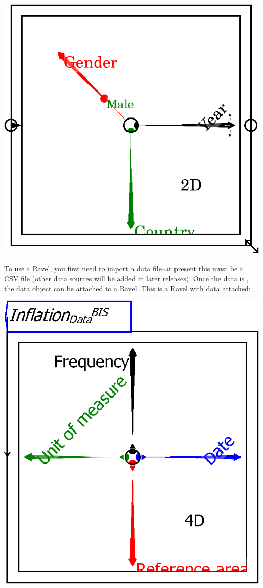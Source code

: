 \begin{center}
  \includegraphics{images/RavelBlank}
\end{center}

To use a Ravel, you first need to import a data file--at present
this must be a CSV file (other data sources will be added in later
releases). Once the data is , the data object
can be attached to a Ravel. This is a Ravel with data attached:

\begin{center}
\includegraphics{images/01RavelDataInflation} 
\end{center}


